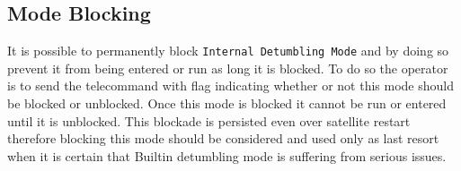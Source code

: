 \subsection{\Adcs Mode Blocking}

It is possible to permanently block \texttt{Internal Detumbling Mode} and by doing so prevent it from 
being entered or run as long it is blocked. To do so the operator is to send the  telecommand with flag indicating whether or not this mode should be blocked 
or unblocked. Once this mode is blocked it cannot be run or entered until it is unblocked. 
This blockade is persisted even over satellite restart therefore blocking this mode should be 
considered and used only as last resort when it is certain that Builtin detumbling mode
is suffering from serious issues.
